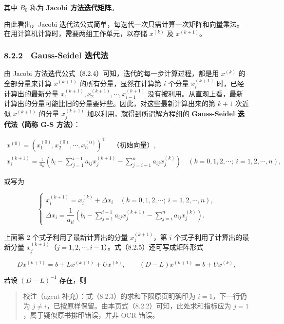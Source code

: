 \documentclass[
  10pt,
  fontset=fandol]{ctexart}
\begin{document}
其中 \(B_0\) 称为 \textbf{Jacobi 方法迭代矩阵}。

由此看出，Jacobi 迭代法公式简单，每迭代一次只需计算一次矩阵和向量乘法。在用计算机计算时，需要两组工作单元，以存储 \(x^{(k)}\) 及 \(x^{(k+1)}\)。

\subsubsection{8.2.2　Gauss-Seidel 迭代法}\label{gauss-seidel-ux8fedux4ee3ux6cd5}

由 Jacobi 方法迭代公式（8.2.4）可知，迭代的每一步计算过程，都是用 \(x^{(k)}\) 的全部分量来计算 \(x^{(k+1)}\) 的所有分量，显然在计算第 \(i\) 个分量 \(x_i^{(k+1)}\) 时，已经计算出的最新分量 \(x_1^{(k+1)},x_2^{(k+1)},\cdots,x_{i-1}^{(k+1)}\) 没有被利用。从直观上看，最新计算出的分量可能比旧的分量要好些。因此，对这些最新计算出来的第 \(k+1\) 次近似 \(x^{(k+1)}\) 的分量 \(x_j^{(k+1)}\) 加以利用，就得到所谓解方程组的 \textbf{Gauss-Seidel 迭代法（简称 G-S 方法）}：

\[
\begin{gathered}
x^{(0)}=(x_1^{(0)},x_2^{(0)},\cdots,x_n^{(0)})^{\mathrm T}\quad\text{（初始向量）},\\[4pt]
x_i^{(k+1)}=\frac1{a_{ii}}\left(b_i-\sum_{j=1}^{i-1}a_{ij}x_j^{(k+1)}-\sum_{j=i+1}^{n}a_{ij}x_j^{(k)}\right)\quad(k=0,1,2,\cdots;\ i=1,2,\cdots,n),
\end{gathered}
\tag{8.2.5}
\]

或写为

\[
\begin{cases}
x_i^{(k+1)}=x_i^{(k)}+\Delta x_i\quad(k=0,1,2,\cdots;\ i=1,2,\cdots,n),\\[4pt]
\Delta x_i=\dfrac1{a_{ii}}\left(b_i-\displaystyle\sum_{j=1}^{i-1}a_{ij}x_j^{(k+1)}-\displaystyle\sum_{j=i}^{n}a_{ij}x_j^{(k)}\right).
\end{cases}
\tag{8.2.5'}
\]

上面第 2 个式子利用了最新计算出的分量 \(x_1^{(k+1)}\)，第 \(i\) 个式子利用了计算出的最新分量 \(x_j^{(k+1)}\)（\(j=1,2,\cdots,i-1\)）。式（8.2.5）还可写成矩阵形式

\[
Dx^{(k+1)}=b+Lx^{(k+1)}+Ux^{(k)},\qquad(D-L)x^{(k+1)}=b+Ux^{(k)},
\]

若设 \((D-L)^{-1}\) 存在，则

\begin{quote}
校注（agent 补充）：式（8.2.3）的求和下限原页明确印为 \(i=1\)，下一行仍为 \(j\neq i\)，已按原样保留。由本页式（8.2.2）可知，此处求和指标应为 \(j=1\)，属于疑似原书排印错误，并非 OCR 错误。
\end{quote}
\end{document}
